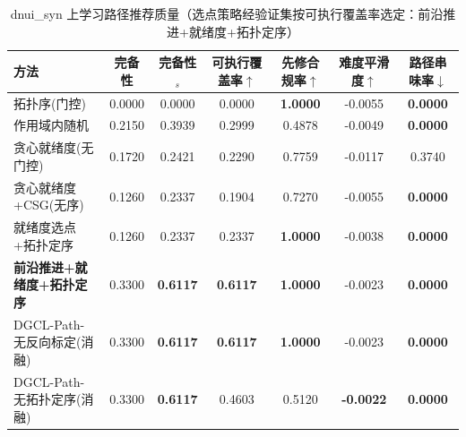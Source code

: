 \begin{table}[htbp]
\centering
\caption{dnui_syn 上学习路径推荐质量（选点策略经验证集按可执行覆盖率选定：前沿推进+就绪度+拓扑定序）}
\label{tab:path_dnui_syn}
\begin{tabular}{lcccccc}
\toprule
方法 & 完备性 & 完备性$_s$ & 可执行覆盖率$\uparrow$ & 先修合规率$\uparrow$ & 难度平滑度$\uparrow$ & 路径串味率$\downarrow$ \\
\midrule
拓扑序(门控) & 0.0000 & 0.0000 & 0.0000 & \textbf{1.0000} & -0.0055 & \textbf{0.0000} \\
作用域内随机 & 0.2150 & 0.3939 & 0.2999 & 0.4878 & -0.0049 & \textbf{0.0000} \\
贪心就绪度(无门控) & 0.1720 & 0.2421 & 0.2290 & 0.7759 & -0.0117 & 0.3740 \\
贪心就绪度+CSG(无序) & 0.1260 & 0.2337 & 0.1904 & 0.7270 & -0.0055 & \textbf{0.0000} \\
就绪度选点+拓扑定序 & 0.1260 & 0.2337 & 0.2337 & \textbf{1.0000} & -0.0038 & \textbf{0.0000} \\
\textbf{前沿推进+就绪度+拓扑定序} & 0.3300 & \textbf{0.6117} & \textbf{0.6117} & \textbf{1.0000} & -0.0023 & \textbf{0.0000} \\
DGCL-Path-无反向标定(消融) & 0.3300 & \textbf{0.6117} & \textbf{0.6117} & \textbf{1.0000} & -0.0023 & \textbf{0.0000} \\
DGCL-Path-无拓扑定序(消融) & 0.3300 & \textbf{0.6117} & 0.4603 & 0.5120 & \textbf{-0.0022} & \textbf{0.0000} \\
\bottomrule
\end{tabular}
\end{table}